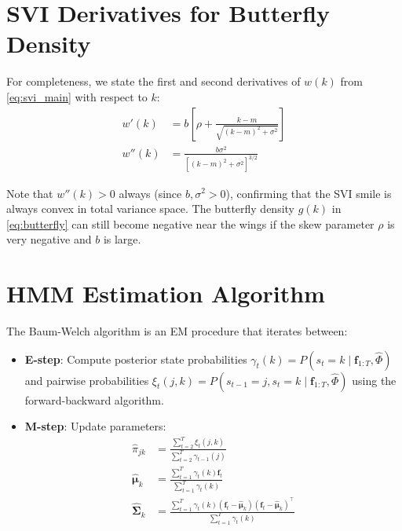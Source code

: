 \documentclass[12pt, letterpaper]{article}
\begin{document}
\appendix

\section{SVI Derivatives for Butterfly Density}
\label{app:svi_derivatives}

For completeness, we state the first and second derivatives of $w(k)$ from
\eqref{eq:svi_main} with respect to $k$:
\begin{align}
  w'(k) &= b\left[\rho + \frac{k - m}{\sqrt{(k-m)^2 + \sigma^2}}\right] \label{eq:wprime}\\
  w''(k) &= \frac{b\sigma^2}{\left[(k-m)^2 + \sigma^2\right]^{3/2}} \label{eq:wdoubleprime}
\end{align}

Note that $w''(k) > 0$ always (since $b, \sigma^2 > 0$), confirming that the
SVI smile is always convex in total variance space. The butterfly density $g(k)$
in \eqref{eq:butterfly} can still become negative near the wings if the skew
parameter $\rho$ is very negative and $b$ is large.

\section{HMM Estimation Algorithm}
\label{app:hmm}

The Baum-Welch algorithm is an EM procedure that iterates between:
\begin{itemize}
  \item \textbf{E-step}: Compute posterior state probabilities
    $\gamma_t(k) = P(s_t = k \mid \mathbf{f}_{1:T}, \hat{\Phi})$
    and pairwise probabilities $\xi_t(j,k) = P(s_{t-1}=j, s_t=k \mid \mathbf{f}_{1:T}, \hat{\Phi})$
    using the forward-backward algorithm.
  \item \textbf{M-step}: Update parameters:
    \begin{align}
      \hat{\pi}_{jk} &= \frac{\sum_{t=2}^T \xi_t(j,k)}{\sum_{t=2}^T \gamma_{t-1}(j)} \\
      \hat{\boldsymbol{\mu}}_k &= \frac{\sum_{t=1}^T \gamma_t(k) \mathbf{f}_t}{\sum_{t=1}^T \gamma_t(k)} \\
      \hat{\boldsymbol{\Sigma}}_k &= \frac{\sum_{t=1}^T \gamma_t(k)(\mathbf{f}_t - \hat{\boldsymbol{\mu}}_k)(\mathbf{f}_t - \hat{\boldsymbol{\mu}}_k)^\top}{\sum_{t=1}^T \gamma_t(k)}
    \end{align}
\end{itemize}
\end{document}

